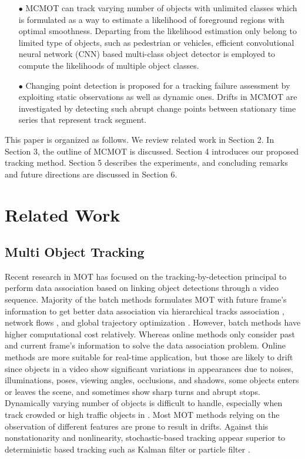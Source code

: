 \documentclass[runningheads]{llncs}
\begin{document}
\begin{itemize}
    \item[$\bullet$] MCMOT can track varying number of objects with unlimited classes which is formulated as a way to estimate a likelihood of foreground regions with optimal smoothness. Departing from the likelihood estimation only belong to limited type of objects, such as pedestrian or vehicles, efficient convolutional neural network (CNN) based multi-class object detector is employed to compute the likelihoods of multiple object classes.
    \item[$\bullet$] Changing point detection is proposed for a tracking failure assessment by exploiting static observations as well as dynamic ones. Drifts in MCMOT are investigated by detecting such abrupt change points between stationary time series that represent track segment.
\end{itemize}

This paper is organized as follows. We review related work in Section 2. In Section 3, the outline of MCMOT is discussed. Section 4 introduces our proposed tracking method. Section 5 describes the experiments, and concluding remarks and future directions are discussed in Section 6.

\section{Related Work}

\subsection{Multi Object Tracking}

Recent research in MOT has focused on the tracking-by-detection principal to perform data association based on linking object detections through a video sequence. Majority of the batch methods formulates MOT with future frame's information to get better data association via hierarchical tracks association \cite{Ref13}, network flows \cite{Ref12}, and global trajectory optimization \cite{Ref11}. However, batch methods have higher computational cost relatively. Whereas online methods only consider past and current frame's information to solve the data association problem. Online methods are more suitable for real-time application, but those are likely to drift since objects in a video show significant variations in appearances due to noises, illuminations, poses, viewing angles, occlusions, and shadows, some objects enters or leaves the scene, and sometimes show sharp turns and abrupt stops. Dynamically varying number of objects is difficult to handle, especially when track crowded or high traffic objects in \cite{Ref9,Ref10,Ref14}. Most MOT methods relying on the observation of different features are prone to result in drifts. Against this nonstationarity and nonlinearity, stochastic-based tracking \cite{Ref22,Ref23,Ref24} appear superior to deterministic based tracking such as Kalman filter \cite{Ref33} or particle filter \cite{Ref2}.
\end{document}

